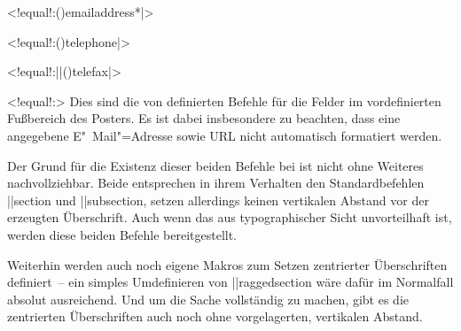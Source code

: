 \begin{DeclareEntity}{}
\begin{Declaration}
  {}
  <!equal!:\Macro(){emailaddress*|}>
\begin{Declaration}
  {}
  <!equal!:\Macro(){telephone|}>
\begin{Declaration}
  {}
  <!equal!:\Macro||(){telefax|}>
\begin{Declaration}
  {}
  <!equal!:>
\printdeclarationlist
%
Dies sind die von  definierten Befehle für die Felder im 
vordefinierten Fußbereich des Posters. Es ist dabei insbesondere zu beachten, 
dass eine angegebene E"~Mail"=Adresse sowie URL nicht automatisch formatiert 
werden.
\end{Declaration}
\end{Declaration}
\end{Declaration}
\end{Declaration}

\begin{Declaration}
  {}
\begin{Declaration}
  {}
\printdeclarationlist
%
Der Grund für die Existenz dieser beiden Befehle bei  ist 
nicht ohne Weiteres nachvollziehbar. Beide entsprechen in ihrem Verhalten den 
Standardbefehlen \Macro||{section} und \Macro||{subsection}, setzen allerdings 
keinen vertikalen Abstand vor der erzeugten Überschrift. Auch wenn das aus 
typographischer Sicht unvorteilhaft ist, werden diese beiden Befehle 
bereitgestellt.
\end{Declaration}
\end{Declaration}

\begin{Declaration}
  {}
\begin{Declaration}
  {}
\begin{Declaration}
  {}
\begin{Declaration}
  {}
\printdeclarationlist
%
Weiterhin werden auch noch eigene Makros zum Setzen zentrierter Überschriften 
definiert~-- ein simples Umdefinieren von \Macro||{raggedsection} wäre dafür im 
Normalfall absolut ausreichend. Und um die Sache vollständig zu machen, gibt es 
die zentrierten Überschriften auch noch ohne vorgelagerten, vertikalen Abstand.
\end{Declaration}
\end{Declaration}
\end{Declaration}
\end{Declaration}


\end{DeclareEntity}
